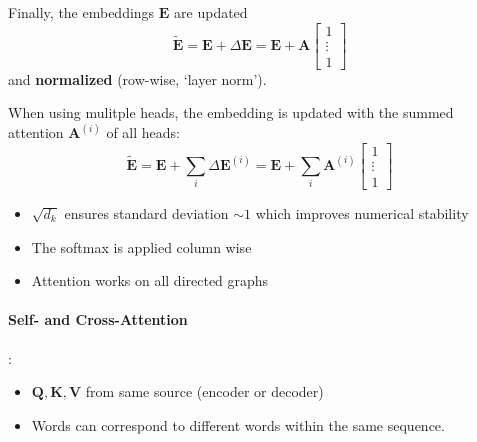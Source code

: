 Finally, the embeddings $\mathbf{E}$ are updated
\noindent\begin{equation*}
    \tilde{\mathbf{E}} = \mathbf{E} + \Delta \mathbf{E} = \mathbf{E} + \mathbf{A}\begin{bmatrix}
        1 \\ \vdots \\ 1
    \end{bmatrix}
\end{equation*}
and \textbf{normalized} (row-wise, `layer norm').

\newpar{}

When using mulitple heads, the embedding is updated with the summed attention $\mathbf{A}^{(i)}$ of all heads:
\noindent\begin{equation*}
    \tilde{\mathbf{E}} = \mathbf{E} + \sum_i \Delta \mathbf{E}^{(i)} = \mathbf{E} + \sum_{i} \mathbf{A}^{(i)}\begin{bmatrix}
        1 \\ \vdots \\ 1
    \end{bmatrix}
\end{equation*}

\begin{itemize}
    \item $\sqrt{d_k}$ ensures standard deviation $\sim 1$ which improves numerical stability
    \item The softmax is applied column wise
    \item Attention works on all directed graphs
\end{itemize}

\paragraph{Self- and Cross-Attention}

:

\begin{itemize}
    \item $\mathbf{Q,K,V}$ from same source (encoder or decoder)
    \item Words can correspond to different words within the same sequence.
\end{itemize}


